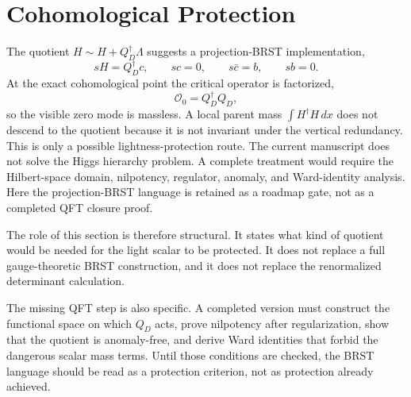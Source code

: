 \documentclass[11pt]{article}
\begin{document}
\section{Cohomological Protection}
The quotient $H\sim H+Q_D^\dagger\Lambda$ suggests a projection-BRST implementation,
\begin{equation}
sH=Q_D^\dagger c,\qquad sc=0,\qquad s\bar c=b,\qquad sb=0 .
\end{equation}
At the exact cohomological point the critical operator is factorized,
\begin{equation}
\mathcal{O}_0=Q_D^\dagger Q_D,
\end{equation}
so the visible zero mode is massless. A local parent mass $\int H^\dagger H\,dx$ does not descend to the quotient because it is not invariant under the vertical redundancy. This is only a possible lightness-protection route. The current manuscript does not solve the Higgs hierarchy problem. A complete treatment would require the Hilbert-space domain, nilpotency, regulator, anomaly, and Ward-identity analysis. Here the projection-BRST language is retained as a roadmap gate, not as a completed QFT closure proof.

The role of this section is therefore structural.  It states what kind of
quotient would be needed for the light scalar to be protected.  It does not
replace a full gauge-theoretic BRST construction, and it does not replace the
renormalized determinant calculation.

The missing QFT step is also specific.  A completed version must construct the
functional space on which $Q_D$ acts, prove nilpotency after regularization,
show that the quotient is anomaly-free, and derive Ward identities that forbid
the dangerous scalar mass terms.  Until those conditions are checked, the BRST
language should be read as a protection criterion, not as protection already
achieved.
\end{document}
